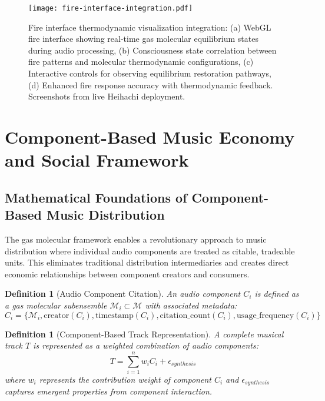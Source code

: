 \documentclass[12pt,a4paper]{article}
\newtheorem{definition}[theorem]{Definition}
\begin{document}
\begin{figure}[h]
\centering
\texttt{[image: fire-interface-integration.pdf]}
\caption{Fire interface thermodynamic visualization integration: (a) WebGL fire interface showing real-time gas molecular equilibrium states during audio processing, (b) Consciousness state correlation between fire patterns and molecular thermodynamic configurations, (c) Interactive controls for observing equilibrium restoration pathways, (d) Enhanced fire response accuracy with thermodynamic feedback. Screenshots from live Heihachi deployment.}
\label{fig:fire_integration}
\end{figure}

\section{Component-Based Music Economy and Social Framework}

\subsection{Mathematical Foundations of Component-Based Music Distribution}

The gas molecular framework enables a revolutionary approach to music distribution where individual audio components are treated as citable, tradeable units. This eliminates traditional distribution intermediaries and creates direct economic relationships between component creators and consumers.

\begin{definition}[Audio Component Citation]
An audio component $C_i$ is defined as a gas molecular subensemble $\mathcal{M}_i \subset \mathcal{M}$ with associated metadata:
\begin{equation}
C_i = \{\mathcal{M}_i, \text{creator}(C_i), \text{timestamp}(C_i), \text{citation\_count}(C_i), \text{usage\_frequency}(C_i)\}
\end{equation}
\end{definition}

\begin{definition}[Component-Based Track Representation]
A complete musical track $T$ is represented as a weighted combination of audio components:
\begin{equation}
T = \sum_{i=1}^{n} w_i C_i + \epsilon_{synthesis}
\end{equation}
where $w_i$ represents the contribution weight of component $C_i$ and $\epsilon_{synthesis}$ captures emergent properties from component interaction.
\end{definition}
\end{document}
